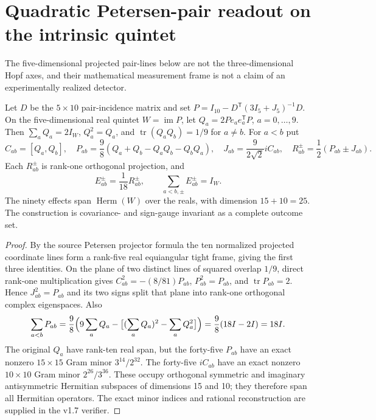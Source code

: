 \documentclass[11pt]{article}
\begin{document}
\section{Quadratic Petersen-pair readout on the intrinsic quintet}
The five-dimensional projected pair-lines below are not the
three-dimensional Hopf axes, and their mathematical measurement frame is not
a claim of an experimentally realized detector.
\label{p1b:sec:v17-coherent-pair-readout-proposal}
\begin{theorem}
\label{p1b:thm:v17-petersen-pair-ic-povm}
Let $D$ be the $5\times10$ pair-incidence matrix and set
$P=I_{10}-D^\mathsf T(3I_5+J_5)^{-1}D$. On the five-dimensional
real quintet $W=\operatorname{im}P$, let
$Q_a=2Pe_ae_a^\mathsf TP$, $a=0,\ldots,9$. Then
$\sum_aQ_a=2I_W$, $Q_a^2=Q_a$, and
$\operatorname{tr}(Q_aQ_b)=1/9$ for $a\ne b$.
For $a<b$ put
\[
 C_{ab}=[Q_a,Q_b],\quad
 P_{ab}=\frac98(Q_a+Q_b-Q_aQ_b-Q_bQ_a),\quad
 J_{ab}=\frac9{2\sqrt2}iC_{ab},
 \quad R_{ab}^\pm=\frac12(P_{ab}\pm J_{ab}).
\]
Each $R_{ab}^\pm$ is rank-one orthogonal projection, and
\[
 \boxed{E_{ab}^\pm=\frac1{18}R_{ab}^\pm,\qquad
 \sum_{a<b,\pm}E_{ab}^\pm=I_W.}
\]
The ninety effects span $\operatorname{Herm}(W)$ over the reals,
with dimension $15+10=25$. The construction is covariance- and
sign-gauge invariant as a complete outcome set.
\end{theorem}
\begin{proof}
By the source Petersen projector formula the ten normalized projected
coordinate lines form a rank-five real equiangular tight frame, giving
the first three identities. On the plane of two distinct lines of squared
overlap $1/9$, direct rank-one multiplication gives
$C_{ab}^2=-(8/81)P_{ab}$, $P_{ab}^2=P_{ab}$, and
$\operatorname{tr}P_{ab}=2$. Hence $J_{ab}^2=P_{ab}$ and its two signs
split that plane into rank-one orthogonal complex eigenspaces.
Also
\[
 \sum_{a<b}P_{ab}=\frac98\Bigl(
 9\sum_aQ_a-\bigl[(\sum_aQ_a)^2-\sum_aQ_a^2\bigr]\Bigr)
 =\frac98(18I-2I)=18I.
\]
The original $Q_a$ have rank-ten real span, but the forty-five $P_{ab}$
have an exact nonzero $15\times15$ Gram minor $3^{14}/2^{32}$.
The forty-five $iC_{ab}$ have an exact nonzero $10\times10$ Gram minor
$2^{26}/3^{36}$. These occupy orthogonal symmetric and imaginary
antisymmetric Hermitian subspaces of dimensions 15 and 10; they
therefore span all Hermitian operators. The exact minor indices and
rational reconstruction are supplied in the v1.7 verifier.
\end{proof}
\end{document}
